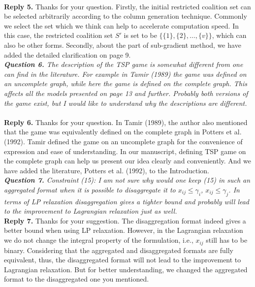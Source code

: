 \documentclass[11pt]{article}
\begin{document}
~\\[2mm]
\noindent \textbf{Reply 5.}
Thanks for your question. Firstly, the initial restricted coalition set can be selected arbitrarily according to the column generation technique. Commonly we select the set which we think can help to accelerate computation speed. In this case, the restricted coalition set $S'$ is set to be $\{\{1\},\{2\},\ldots, \{v\}\}$, which can also be other forms.
Secondly, about the part of sub-gradient method, we have added the detailed clarification on page 9.
\\[4mm]
%
%
\noindent \textit{\textbf{Question 6.}
The description of the TSP game is somewhat different from one can find in the literature. For example in Tamir (1989) the game was defined on an uncomplete graph, while here the game is defined on the complete graph. This affects all the models presented on page 13 and further. Probably both versions of the game exist, but I would like to understand why the descriptions are different.}
~\\[2mm]
\noindent \textbf{Reply 6.}
Thanks for your question. In Tamir (1989), the author also mentioned that the game was equivalently defined on the complete graph in Potters et al. (1992). Tamir defined the game on an uncomplete graph for the convenience of expression and ease of understanding. In our manuscript, defining TSP game on the complete graph can help us present our idea clearly and conveniently. And we have added the literature, Potters et al. (1992), to the Introduction.
\\[4mm]
\noindent \textit{\textbf{Question 7.}
Constraint (15): I am not sure why would one keep (15) in such an aggregated format when it is possible to disaggregate it to $x_{ij} \leq \gamma_i$, $x_{ij} \leq \gamma_j$. In terms of LP relaxation disaggregation gives a tighter bound and probably will lead to the improvement to Lagrangian relaxation just as well.}
\\[2mm]
\noindent \textbf{Reply 7.}
Thanks for your suggestion.
The disaggregation format indeed gives a better bound when using LP relaxation.
However, in the Lagrangian relaxation we do not change the integral property of the formulation, i.e., $x_{ij}$ still has to be binary. Considering that the aggregated and disaggregated formats are fully equivalent, thus, the disaggregated format will not lead to the improvement to Lagrangian relaxation.
But for better understanding, we changed the aggregated format to the disaggregated one you mentioned.
\end{document}
